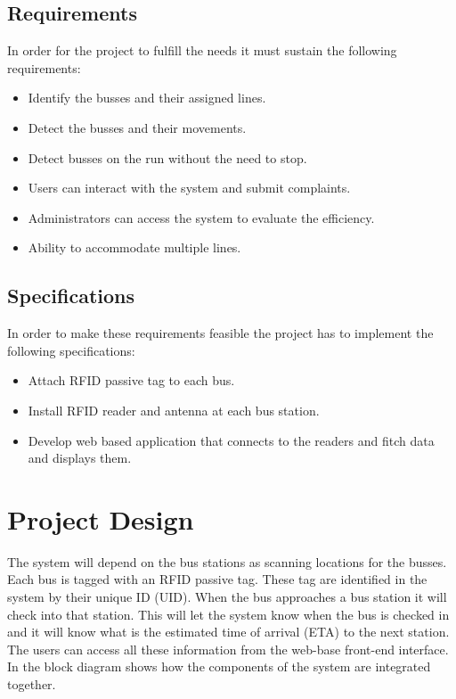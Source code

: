 \documentclass[a4paper,twoside]{IEEEtran}
\begin{document}
\subsection{Requirements}
In order for the project to fulfill the needs it must sustain the following requirements:
\begin{itemize}
\item
Identify the busses and their assigned lines.
\item
Detect the busses and their movements.
\item
Detect busses on the run without the need to stop.
\item
Users can interact with the system and submit complaints.
\item
Administrators can access the system to evaluate the efficiency.
\item
Ability to accommodate multiple lines.
\end{itemize}
\subsection{Specifications}
In order to make these requirements feasible the project has to implement the following specifications:
\begin{itemize}
\item 
Attach RFID passive tag to each bus.
\item
Install RFID reader and antenna at each bus station.
\item
Develop web based application that connects to the readers and fitch data and displays them.
\end{itemize}


\section{Project Design}
The system will depend on the bus stations as scanning locations for the busses. Each bus is tagged with an RFID passive tag. These tag are identified in the system by their unique ID (UID). When the bus approaches a bus station it will check into that station. This will let the system know when the bus is checked in and it will know what is the estimated time of arrival (ETA) to the next station. The users can access all these information from the web-base front-end interface. In  the block diagram shows how the components of the system are integrated together.
\end{document}

